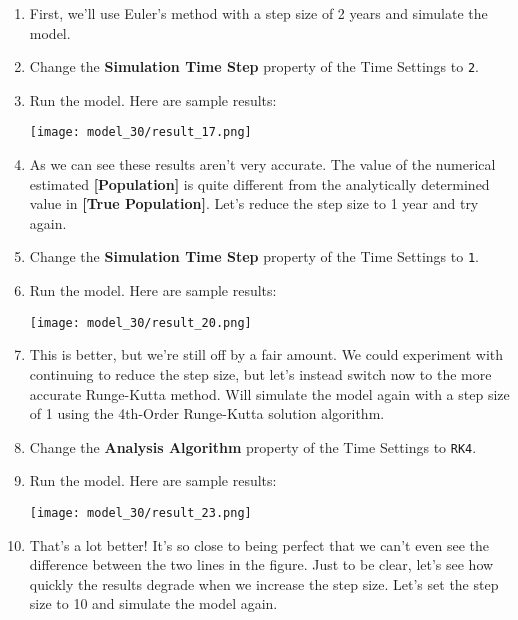 \documentclass[]{memoir}
\makeatletter
\def\maxwidth{\ifdim\Gin@nat@width>\linewidth\linewidth
\else\Gin@nat@width\fi}
\let\Oldincludegraphics\includegraphics
\renewcommand{\includegraphics}[1]{\Oldincludegraphics[width=\maxwidth]{#1}}
\newcommand{\p}[1]{\textbf{{[}#1{]}}}
\newcommand{\e}[1]{\texttt{#1}}
\renewcommand{\a}[1]{\textbf{#1}}
\makeatother
\begin{document}
\begin{oframed}
\begin{enumerate}
\item 

First, we'll use Euler's method with a step size of 2 years and simulate the model.


\item  Change the \a{Simulation Time Step} property of the Time Settings to \e{2}.
\item Run the model. Here are sample results:\par \begin{minipage}{\linewidth}  \centering \texttt{[image: model\_30/result\_17.png]}
\end{minipage}
\item 

As we can see these results aren't very accurate. The value of the numerical estimated \p{Population} is quite different from the analytically determined value in \p{True Population}. Let's reduce the step size to 1 year and try again.


\item  Change the \a{Simulation Time Step} property of the Time Settings to \e{1}.
\item Run the model. Here are sample results:\par \begin{minipage}{\linewidth}  \centering \texttt{[image: model\_30/result\_20.png]}
\end{minipage}
\item 

This is better, but we're still off by a fair amount. We could experiment with continuing to reduce the step size, but let's instead switch now to the more accurate Runge-Kutta method. Will simulate the model again with a step size of 1 using the 4th-Order Runge-Kutta solution algorithm.


\item  Change the \a{Analysis Algorithm} property of the Time Settings to \e{RK4}.
\item Run the model. Here are sample results:\par \begin{minipage}{\linewidth}  \centering \texttt{[image: model\_30/result\_23.png]}
\end{minipage}
\item 

That's a lot better! It's so close to being perfect that we can’t even see the difference between the two lines in the figure. Just to be clear, let's see how quickly the results degrade when we increase the step size. Let's set the step size to 10 and simulate the model again.



\end{enumerate}
\end{oframed}
\end{document}
